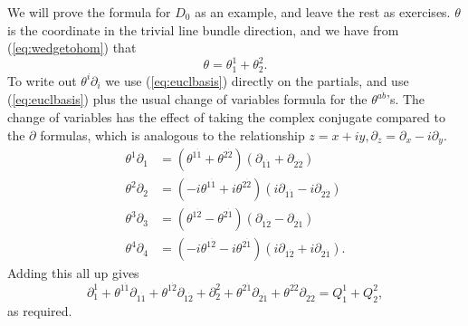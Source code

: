 \documentclass[twoside]{amsart}
\renewcommand{\eqref}[1]{(\ref{eq:#1})}
\newcommand{\enm}[1]{\ensuremath{#1}}
\newcommand{\bothupperabc}[3]{\enm{{#1}^{#2 #3}}}
\newcommand{\bothlowerabc}[3]{\enm{{#1}_{#2 #3}}}
\newcommand{\upperlowerabc}[3]{\enm{{#1}^{#2}_{#3}}}
\newcommand{\dotbothupperabc}[3]{\bothupperabc{#1}{#2}{\dot{#3}}}
\newcommand{\dotbothlowerabc}[3]{\bothlowerabc{#1}{#2}{\dot{#3}}}
\newcommand{\tudu}[2]{\dotbothupperabc{\theta}{#1}{#2}}
\newcommand{\pldl}[2]{\dotbothlowerabc{\partial}{#1}{#2}}
\newcommand{\qul}[2]{\upperlowerabc{Q}{#1}{#2}}
\begin{document}
We will prove the formula for \( D_{0} \) as an example, and leave
the
rest as exercises.  \( \theta
\) is the coordinate in the trivial line bundle direction, and we
have
from \eqref{wedgetohom} that
\[ \theta = \theta^{1}_{1} + \theta^{2}_{2}. \]
To write out \( \theta^{i}\partial_{i} \) we use \eqref{euclbasis}
directly  on
the partials, and use \eqref{euclbasis} plus the usual change of variables
formula for the \( \tudu{a}{b}
\)'s.  The change of variables has the effect of taking the complex
conjugate compared to
the \( \partial \) formulas, which is analogous to the relationship
\(
z = x+iy, \partial_{z} = \partial_{x} - i\partial_{y}. \)
\begin{align*}
    \theta^{1}\partial_{1} &= ( \tudu{1}{1} +  \tudu{2}{2})
                              ( \pldl{1}{1} +  \pldl{2}{2}) \\
    \theta^{2}\partial_{2} &= (-i\tudu{1}{1} + i\tudu{2}{2})
                              (i\pldl{1}{1} - i\pldl{2}{2}) \\
    \theta^{3}\partial_{3} &= ( \tudu{1}{2} -  \tudu{2}{1})
                              ( \pldl{1}{2} -  \pldl{2}{1}) \\
    \theta^{4}\partial_{4} &= (-i\tudu{1}{2} - i\tudu{2}{1})
                              (i\pldl{1}{2} + i\pldl{2}{1}).
\end{align*}
Adding this all up gives
\[ \partial^{1}_{1} + \tudu{1}{1}\pldl{1}{1} +
\tudu{1}{2}\pldl{1}{2} + \partial^{2}_{2} +
\tudu{2}{1}\pldl{2}{1} + \tudu{2}{2}\pldl{2}{2} = \qul{1}{1} +
\qul{2}{2}, \]
as required.
\end{document}
